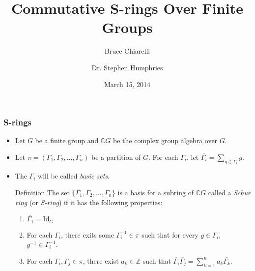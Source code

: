 \documentclass{beamer}
\title[Commutative S-rings]{Commutative S-rings Over Finite
  Groups}
\author[Bruce Chiarelli]{Bruce Chiarelli \and Dr. Stephen Humphries}
\institute[BYU]{Brigham Young University}
\date{March 15, 2014}
\begin{document}

\begin{frame}
\titlepage 
\end{frame}


\begin{frame}
\frametitle{S-rings}
\begin{itemize}
\item Let $G$ be a finite group and $\mathbb{C}G$ be the complex group
  algebra over $G$.\pause
\item Let $\pi=(\Gamma_1,\Gamma_2,\ldots,\Gamma_n)$ be a partition of
  $G$. For each $\Gamma_i$, let
  $\overline{\Gamma_i}=\sum_{g\in\Gamma_i}g$.\pause
\item The $\Gamma_i$ will be called \textit{basic sets}.\pause
\begin{block}{Definition}
  The set $\{\overline{\Gamma_1}, \overline{\Gamma_2}
  ,\ldots,\overline{\Gamma_n}\}$ is a basis for a subring of
  $\mathbb{C}G$ called a \textit{Schur ring} (or \textit{S-ring}) if
  it has the following properties:
\begin{enumerate}
\item $\overline{\Gamma_1}=\mathrm{Id}_G$\pause
\item For each $\Gamma_i$, there exits some $\Gamma_i^{-1}\in\pi$ such
  that for every $g\in\Gamma_i$, $g^{-1}\in\Gamma_i^{-1}$.\pause
\item For each $\Gamma_i, \Gamma_j\in\pi$, there exist
  $a_k\in\mathbb{Z}$ such that $\overline{\Gamma_i}
  \overline{\Gamma_j}=\sum_{k=1}^{n}a_k\overline{\Gamma_k}$.
\end{enumerate}
\end{block}
\end{itemize}
\end{frame}

\end{document}

